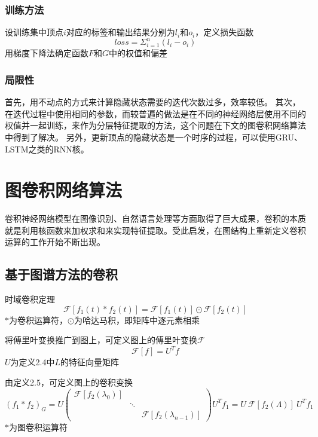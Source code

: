 \subsubsection{训练方法}
设训练集中顶点$i$对应的标签和输出结果分别为$l_i$和$o_i$，定义损失函数
\begin{equation}
    loss=\Sigma ^n_{i=1} (l_i-o_i)
\end{equation}
用梯度下降法确定函数$F$和$G$中的权值和偏差

\subsubsection{局限性}
首先，用不动点的方式来计算隐藏状态需要的迭代次数过多，效率较低。
其次，在迭代过程中使用相同的参数，而较普遍的做法是在不同的神经网络层使用不同的权值并一起训练，来作为分层特征提取的方法，这个问题在下文的图卷积网络算法中得到了解决。
另外，更新顶点的隐藏状态是一个时序的过程，可以使用GRU、LSTM之类的RNN核。

\section{图卷积网络算法}
卷积神经网络模型在图像识别、自然语言处理等方面取得了巨大成果，卷积的本质就是利用核函数来加权求和来实现特征提取。受此启发，在图结构上重新定义卷积运算的工作开始不断出现。

\subsection{基于图谱方法的卷积}

\begin{theorem}
    时域卷积定理
    \begin{equation}
        \mathcal{F}\left[f_{1}(t) * f_{2}(t)\right]=\mathcal{F}\left[f_{1}(t)\right] \odot \mathcal{F}\left[f_{2}(t)\right]
    \end{equation}
    $*$为卷积运算符，$\odot$为哈达马积，即矩阵中逐元素相乘
\end{theorem}

\begin{definition}
    将傅里叶变换推广到图上，可定义图上的傅里叶变换$\mathcal{F}$
    \begin{equation}
        \mathcal{F}[f]=U^Tf
    \end{equation}
    $U$为定义2.4中$L$的特征向量矩阵
\end{definition}

\begin{definition}
    由定义2.5，可定义图上的卷积变换
    \begin{equation}
        (f_1*f_2)_G=U\left(\begin{array}{ccc}
            \mathcal{F}[f_2(\lambda_0)] & & \\
            & \ddots & \\
            & & \mathcal{F}[f_2(\lambda_{n-1})]
            \end{array}\right)U^Tf_1=U\ \mathcal{F}[f_2(\Lambda)]\ U^Tf_1
    \end{equation}
    $*$为图卷积运算符
\end{definition}

